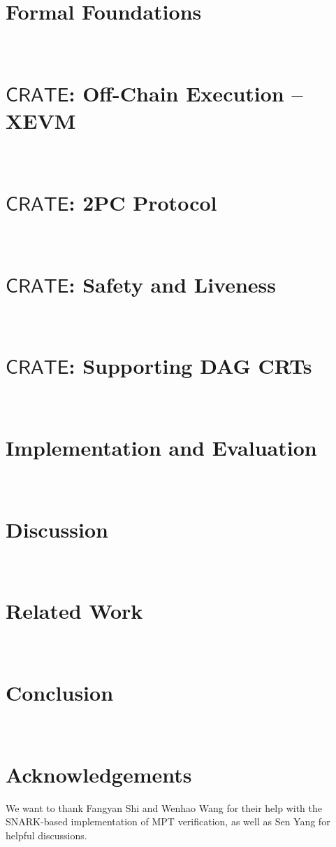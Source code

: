 \documentclass[letterpaper,twocolumn,10pt]{article}
\newcommand{\pname}{\texorpdfstring{\ensuremath{\mathsf{CRATE}}}{CRATE}}
\begin{document}
\section{Formal Foundations}~\label{sec:foundations}



\section{\pname: Off-Chain Execution -- XEVM}~\label{sec:xevm}


\section{\pname: 2PC Protocol}~\label{sec:2pc-trustless}


\section{\pname: Safety and Liveness}~\label{sec:safety-liveness}



\section{\pname: Supporting DAG CRTs}~\label{sec:dag-crt-protocol}



\section{Implementation and Evaluation}~\label{sec:implementation}





\section{Discussion}~\label{sec:discussion}


\section{Related Work}~\label{sec:relwork}



\section{Conclusion}~\label{sec:conclusion}



\section*{Acknowledgements}
We want to thank Fangyan Shi and Wenhao Wang for their help with the SNARK-based implementation of MPT verification, as well as Sen Yang for helpful discussions.







\appendix
\newpage

\end{document}
